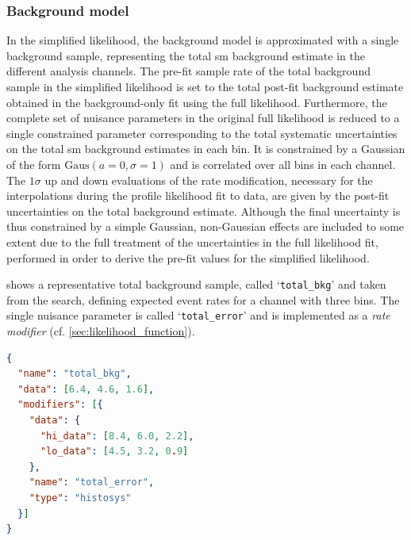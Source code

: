 \subsubsection{Background model}

In the simplified likelihood, the background model is approximated with a single background sample, representing the total \gls{sm} background estimate in the different analysis channels.
The pre-fit sample rate of the total background sample in the simplified likelihood is set to the total post-fit background estimate obtained in the background-only fit using the full likelihood.
Furthermore, the complete set of nuisance parameters in the original full likelihood is reduced to a single constrained parameter corresponding to the total systematic uncertainties on the total \gls{sm} background estimates in each bin.
It is constrained by a Gaussian of the form $\mathrm{Gaus}(a = 0, \sigma = 1)$ and is correlated over all bins in each channel. The $1\sigma$ up and down evaluations of the rate modification, necessary for the interpolations during the profile likelihood fit to data, are given by the post-fit uncertainties on the total background estimate.
Although the final uncertainty is thus constrained by a simple Gaussian, non-Gaussian effects are included to some extent due to the full treatment of the uncertainties in the full likelihood fit, performed in order to derive the pre-fit values for the simplified likelihood.

 shows a representative total background sample, called `\texttt{total\_bkg}' and taken from the \onelepton search, defining expected event rates for a channel with three bins. The single nuisance parameter is called `\texttt{total\_error}' and is implemented as a \textit{rate modifier} (cf. \cref{sec:likelihood_function}).

\begin{minipage}{\linewidth}
\begin{lstlisting}[language=json,firstnumber=1,caption={Representative total background sample with sample rate and total uncertainty for three separate bins, derived from a fit in the \glspl{sr} and \glspl{cr} using the full likelihood. The \texttt{histosys} type modifier in \lib{HistFactory} implements a shape uncertainty correlated over all bins.},captionpos=b, label=lst:bkg_sample]
{
  "name": "total_bkg",
  "data": [6.4, 4.6, 1.6],
  "modifiers": [{
    "data": {
      "hi_data": [8.4, 6.0, 2.2], 
      "lo_data": [4.5, 3.2, 0.9]
    }, 
    "name": "total_error",
    "type": "histosys"
  }]
}
\end{lstlisting}
\end{minipage}

